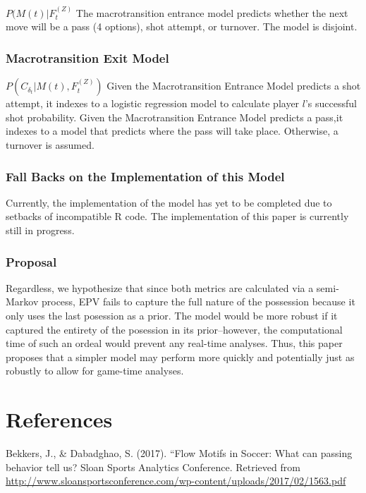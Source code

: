 \documentclass[12pt,twoside]{dukestatscithesis}
\theoremstyle{definition}
\theoremstyle{definition}
\theoremstyle{definition}
\theoremstyle{remark}
\begin{document}
\(P(M(t)|F_{t}^{(Z)}\) The macrotransition entrance model predicts
whether the next move will be a pass (4 options), shot attempt, or
turnover. The model is disjoint.

\subsection{Macrotransition Exit
Model}\label{macrotransition-exit-model}

\(P(C_{\delta_{t}}|M(t), F_{t}^{(Z)})\) Given the Macrotransition
Entrance Model predicts a shot attempt, it indexes to a logistic
regression model to calculate player \(l\)'s successful shot
probability. Given the Macrotransition Entrance Model predicts a pass,it
indexes to a model that predicts where the pass will take place.
Otherwise, a turnover is assumed.

\subsection{Fall Backs on the Implementation of this
Model}\label{fall-backs-on-the-implementation-of-this-model}

Currently, the implementation of the model has yet to be completed due
to setbacks of incompatible R code. The implementation of this paper is
currently still in progress.

\subsection{Proposal}\label{proposal}

Regardless, we hypothesize that since both metrics are calculated via a
semi-Markov process, EPV fails to capture the full nature of the
possession because it only uses the last posession as a prior. The model
would be more robust if it captured the entirety of the posession in its
prior--however, the computational time of such an ordeal would prevent
any real-time analyses. Thus, this paper proposes that a simpler model
may perform more quickly and potentially just as robustly to allow for
game-time analyses.

\backmatter

\chapter*{References}\label{references}

Bekkers, J., \& Dabadghao, S. (2017). ``Flow Motifs in Soccer: What can
passing behavior tell us? Sloan Sports Analytics Conference. Retrieved
from
\url{http://www.sloansportsconference.com/wp-content/uploads/2017/02/1563.pdf}
\end{document}
